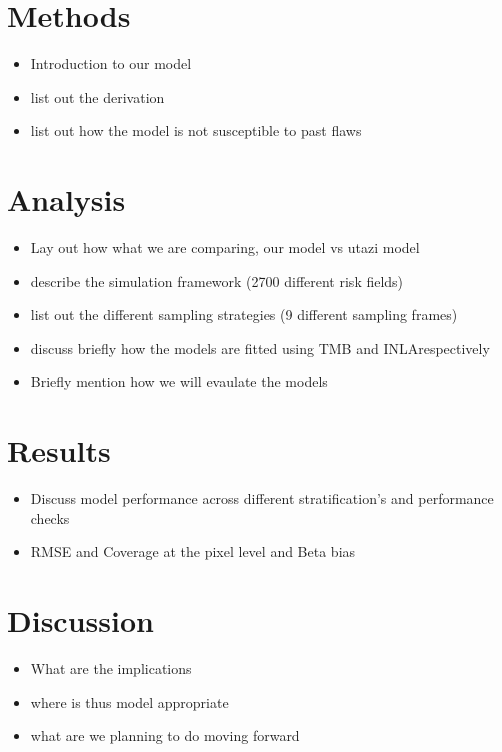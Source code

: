 \documentclass{article}
\begin{document}
\section{Methods}\label{methods}

\begin{itemize}
\item Introduction to our model
\item list out the derivation
\item list out how the model is not susceptible to past flaws
\end{itemize}

\section{Analysis}\label{analysis}

\begin{itemize}
\item Lay out how what we are comparing, our model vs utazi model
\item describe the simulation framework (2700 different risk fields)
\item list out the different sampling strategies (9 different sampling frames)
\item discuss briefly how the models are fitted using TMB and INLArespectively
\item Briefly mention how we will evaulate the models
\end{itemize}

\section{Results}\label{results}

\begin{itemize}
\item  Discuss model performance across different stratification's and performance checks
\item RMSE and Coverage at the pixel level and Beta bias
\end{itemize}

\section{Discussion}\label{discussion}

\begin{itemize}
\item What are the implications
\item where is thus model appropriate
\item what are we planning to do moving forward
\end{itemize}

\newpage



\end{document}
